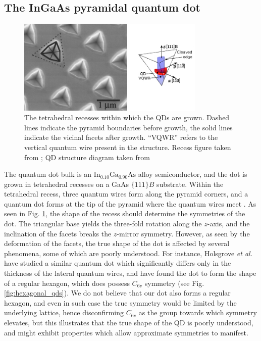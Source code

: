 \documentclass[12pt]{article}
\begin{document}
\subsection{The InGaAs pyramidal quantum dot} \label{sec:growth}
\begin{figure}
\begin{center}

    \includegraphics[width=0.8\textwidth]{figures/pyramidal_qds}
 \caption{The tetrahedral recesses within which the QDs are grown. Dashed lines indicate the pyramid boundaries before growth, the solid lines indicate the vicinal facets after growth. ``VQWR'' refers to the vertical quantum wire present in the structure. Recess figure taken from \cite[Fig. 1]{pyramidal_qds}; QD structure diagram taken from \cite[Fig. 1]{karlsson}\label{fig:pyramidal_qds}}
\end{center}
\end{figure}

The quantum dot bulk is an $\text{In}_{0.10}\text{Ga}_{0.90}\text{As}$ alloy semiconductor, and the dot is grown in tetrahedral recesses on a GaAs $\{111\}B$ substrate. Within the tetrahedral recess, three quantum wires form along the pyramid corners, and a quantum dot forms at the tip of the pyramid where the quantum wires meet \cite{pyramidal_qds}. As seen in Fig. \ref{fig:pyramidal_qds}, the shape of the recess should determine the symmetries of the dot. The triangular base yields the three-fold rotation along the $z$-axis, and the inclination of the facets breaks the $z$-mirror symmetry. However, as seen by the deformation of the facets, the true shape of the dot is affected by several phenomena, some of which are poorly understood. For instance, Holsgrove \textit{et al.} have studied a similar quantum dot which significantly differs only in the thickness of the lateral quantum wires, and have found the dot to form the shape of a regular hexagon, which does possess $C_{6v}$ symmetry \cite{hexagon} (see Fig. \ref{fig:hexagonal_qds}). We do not believe that our dot also forms a regular hexagon, and even in such case the true symmetry would be limited by the underlying lattice, hence disconfirming $C_{6v}$ as the group towards which symmetry elevates, but this illustrates that the true shape of the QD is poorly understood, and might exhibit properties which allow approximate symmetries to manifest.
\end{document}
